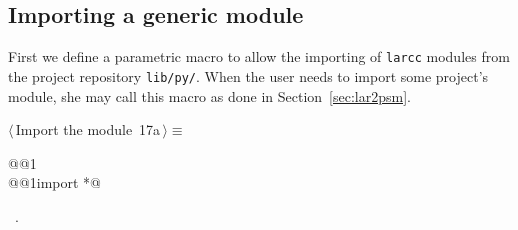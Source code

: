 \documentclass[11pt,oneside]{article}	%
\begin{document}
\subsection{Importing a generic module}
First we define a parametric macro to allow the importing of \texttt{larcc} modules from the project repository \texttt{lib/py/}. When the user needs to import some project's module, she may call this macro as done in Section~\ref{sec:lar2psm}.
\begin{flushleft} \small
\begin{minipage}{\linewidth} \label{scrap29}
\protect{}$\langle\,$Import the module\nobreak\ {\footnotesize 17a}$\,\rangle\equiv$
\vspace{-1ex}
\begin{list}{}{} \item
\mbox{}\verb@import @@1\verb@@\\
\mbox{}\verb@from @@1\verb@ import *@\\
\mbox{}\verb@@{\NWsep}
\end{list}
\vspace{-1ex}
\footnotesize\addtolength{\baselineskip}{-1ex}
\begin{list}{}{\setlength{\itemsep}{-\parsep}\setlength{\itemindent}{-\leftmargin}}
\item \NWtxtMacroRefIn\ .
\end{list}
\end{minipage}\\[4ex]
\end{flushleft}
\end{document}
